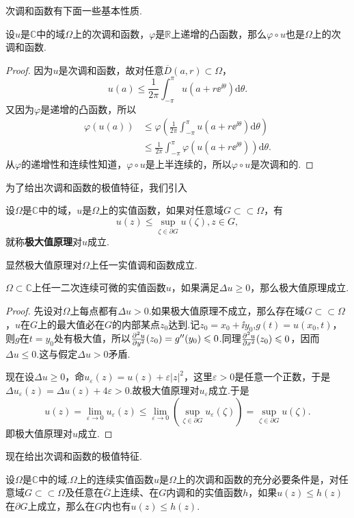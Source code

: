 次调和函数有下面一些基本性质.
\begin{prop}\label{prop1.5.2}
	设$u$是$\mathbb{C}$中的域$\Omega$上的次调和函数，$\varphi$是$\mathbb{R}$上递增的凸函数，那么$\varphi\circ u$也是$\Omega$上的次调和函数.
\end{prop}
\begin{proof}
	因为$u$是次调和函数，故对任意$\overline{D}(a,r)\subset\Omega$，
	\[u(a)\le\frac1{2\pi}\int_{-\pi}^{\pi} u(a+r\ee^{\ii\theta})\mathrm{d}\theta.\]
	又因为$\varphi$是递增的凸函数，所以
	\begin{align*}
		\varphi(u(a))
		&\le \varphi\left(\frac1{2\pi}\int_{-\pi}^{\pi}u(a+r\ee^{\ii\theta})\mathrm{d}\theta\right)\\
		&\le\frac1{2\pi} \int_{-\pi}^{\pi}\varphi(u(a+r\ee^{\ii\theta}))\mathrm{d}\theta.
	\end{align*}
从$\varphi$的递增性和连续性知道，$\varphi\circ u$是上半连续的，所以$\varphi\circ u$是次调和的.
\end{proof}
为了给出次调和函数的极值特征，我们引入
\begin{definition}\label{def1.5.3}
	设$\Omega$是$\mathbb{C}$中的域，$u$是$\Omega$上的实值函数，如果对任意域$G\subset\subset\Omega$，有
	\[u(z)\le\sup_{\zeta\in\partial G}u(\zeta),z\in G,\]
	就称\textbf{极大值原理}对$u$成立.
\end{definition}
显然极大值原理对$\Omega$上任一实值调和函数成立.
\begin{prop}\label{prop1.5.4}
	$\Omega\subset\mathbb{C}$上任一二次连续可微的实值函数$u$，如果满足$\Delta u\ge0$，那么极大值原理成立.
\end{prop}
\begin{proof}
	先设对$\Omega$上每点都有$\Delta u>0$.如果极大值原理不成立，那么存在域$G\subset\subset\Omega$，$u$在$G$上的最大值必在$G$的内部某点$z_0$达到.记$z_0=x_0+\ii y_0$,$g(t)=u(x_0,t)$，则$g$在$t=y_0$处有极大值，所以$\frac{\partial^2 u}{\partial y^2} (z_0)=g''(y_0)\leqslant 0$.同理$\frac{\partial^2 u}{\partial x^2} (z_0)\leqslant 0$，因而$\Delta u\le 0$.这与假定$\Delta u>0$矛盾.
	
	现在设$\Delta u\ge 0$，命$u_\varepsilon(z)=u(z)+\varepsilon|z|^2$，这里$\varepsilon>0$是任意一个正数，于是$\Delta u_\varepsilon(z)=\Delta u(z)+4\varepsilon>0$.故极大值原理对$u_\varepsilon$成立.于是
	\[u(z)=\lim\limits_{\varepsilon\to0}u_\varepsilon(z)\le\lim\limits_{\varepsilon\to0}(\sup_{\zeta\in\partial G} u_\varepsilon(\zeta))=\sup_{\zeta\in\partial G}u(\zeta).\]
	即极大值原理对$u$成立.
\end{proof}
现在给出次调和函数的极值特征.
\begin{theorem}\label{thm1.5.5}
	设$\Omega$是$\mathbb{C}$中的域.$\Omega$上的连续实值函数$u$是$\Omega$上的次调和函数的充分必要条件是，对任意域$G\subset\subset\Omega$及任意在$\bar{G}$上连续、在$G$内调和的实值函数$h$，如果$u(z)\le h(z)$在$\partial G$上成立，那么在$G$内也有$u(z)\le h(z)$.
\end{theorem}
